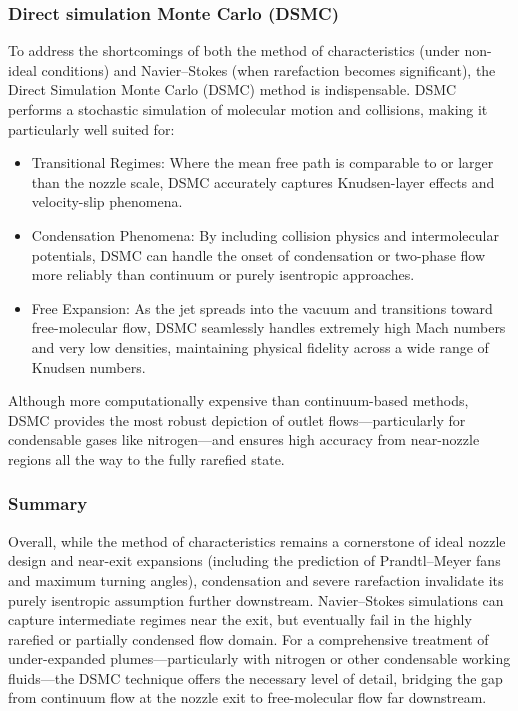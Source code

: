 \subsubsection*{Direct simulation Monte Carlo (DSMC)}
	To address the shortcomings of both the method of characteristics (under non-ideal conditions) and Navier–Stokes (when rarefaction becomes significant), the Direct Simulation Monte Carlo (DSMC) method is indispensable.
	DSMC performs a stochastic simulation of molecular motion and collisions, making it particularly well suited for:
	\begin{itemize}
		\item Transitional Regimes: Where the mean free path is comparable to or larger than the nozzle scale, DSMC accurately captures Knudsen-layer effects and velocity-slip phenomena.
		\item Condensation Phenomena: By including collision physics and intermolecular potentials, DSMC can handle the onset of condensation or two-phase flow more reliably than continuum or purely isentropic approaches. \cite{EMMONS1958}
		\item Free Expansion: As the jet spreads into the vacuum and transitions toward free-molecular flow, DSMC seamlessly handles extremely high Mach numbers and very low densities, maintaining physical fidelity across a wide range of Knudsen numbers.
	\end{itemize}
	Although more computationally expensive than continuum-based methods, DSMC provides the most robust depiction of outlet flows—particularly for condensable gases like nitrogen—and ensures high accuracy from near-nozzle regions all the way to the fully rarefied state.
	\cite{putignano2012supersonic, liu_study_2006}
	\newpage
\subsubsection*{Summary}
	Overall, while the method of characteristics remains a cornerstone of ideal nozzle design and near-exit expansions (including the prediction of Prandtl–Meyer fans and maximum turning angles), condensation and severe rarefaction invalidate its purely isentropic assumption further downstream.
	Navier–Stokes simulations can capture intermediate regimes near the exit, but eventually fail in the highly rarefied or partially condensed flow domain.
	For a comprehensive treatment of under-expanded plumes—particularly with nitrogen or other condensable working fluids—the DSMC technique offers the necessary level of detail, bridging the gap from continuum flow at the nozzle exit to free-molecular flow far downstream.
